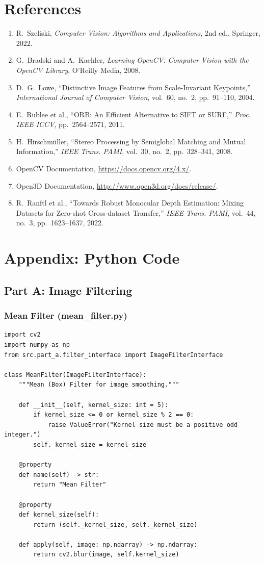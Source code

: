 \documentclass[a4paper,12pt]{article}
\begin{document}
\section{References}
\begin{enumerate}
    \item R.~Szeliski, \textit{Computer Vision: Algorithms and Applications}, 2nd ed., Springer, 2022.
    \item G.~Bradski and A.~Kaehler, \textit{Learning OpenCV: Computer Vision with the OpenCV Library}, O'Reilly Media, 2008.
    \item D.~G.~Lowe, ``Distinctive Image Features from Scale-Invariant Keypoints,'' \textit{International Journal of Computer Vision}, vol.~60, no.~2, pp.~91--110, 2004.
    \item E.~Rublee et al., ``ORB: An Efficient Alternative to SIFT or SURF,'' \textit{Proc. IEEE ICCV}, pp.~2564--2571, 2011.
    \item H.~Hirschm{\"u}ller, ``Stereo Processing by Semiglobal Matching and Mutual Information,'' \textit{IEEE Trans. PAMI}, vol.~30, no.~2, pp.~328--341, 2008.
    \item OpenCV Documentation, \url{https://docs.opencv.org/4.x/}.
    \item Open3D Documentation, \url{http://www.open3d.org/docs/release/}.
    \item R.~Ranftl et al., ``Towards Robust Monocular Depth Estimation: Mixing Datasets for Zero-shot Cross-dataset Transfer,'' \textit{IEEE Trans. PAMI}, vol.~44, no.~3, pp.~1623--1637, 2022.
\end{enumerate}

\appendix
\section{Appendix: Python Code}

\subsection{Part A: Image Filtering}

\subsubsection*{Mean Filter (mean\_filter.py)}
\begin{lstlisting}
import cv2
import numpy as np
from src.part_a.filter_interface import ImageFilterInterface

class MeanFilter(ImageFilterInterface):
    """Mean (Box) Filter for image smoothing."""

    def __init__(self, kernel_size: int = 5):
        if kernel_size <= 0 or kernel_size % 2 == 0:
            raise ValueError("Kernel size must be a positive odd integer.")
        self._kernel_size = kernel_size

    @property
    def name(self) -> str:
        return "Mean Filter"

    @property
    def kernel_size(self):
        return (self._kernel_size, self._kernel_size)

    def apply(self, image: np.ndarray) -> np.ndarray:
        return cv2.blur(image, self.kernel_size)
\end{lstlisting}
\end{document}
